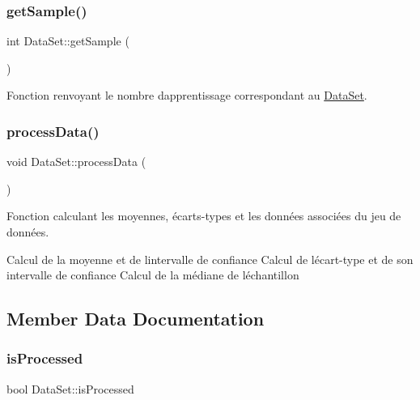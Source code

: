 \subsubsection{\texorpdfstring{get\+Sample()}{getSample()}}
{\footnotesize\ttfamily int Data\+Set\+::get\+Sample (\begin{DoxyParamCaption}{ }\end{DoxyParamCaption})}



Fonction renvoyant le nombre d\textquotesingle{}apprentissage correspondant au \hyperlink{classDataSet}{Data\+Set}. 

\mbox{\label{classDataSet_a6e174dbffadb1a262c6cc92781d0bd12}} 
\subsubsection{\texorpdfstring{process\+Data()}{processData()}}
{\footnotesize\ttfamily void Data\+Set\+::process\+Data (\begin{DoxyParamCaption}{ }\end{DoxyParamCaption})}



Fonction calculant les moyennes, écarts-\/types et les données associées du jeu de données. 

Calcul de la moyenne et de l\textquotesingle{}intervalle de confiance Calcul de l\textquotesingle{}écart-\/type et de son intervalle de confiance Calcul de la médiane de l\textquotesingle{}échantillon 

\subsection{Member Data Documentation}
\mbox{\label{classDataSet_acc6a6082256c926e1ad8bfa713966441}} 
\subsubsection{\texorpdfstring{is\+Processed}{isProcessed}}
{\footnotesize\ttfamily bool Data\+Set\+::is\+Processed\hspace{0.3cm}{\ttfamily [private]}}



